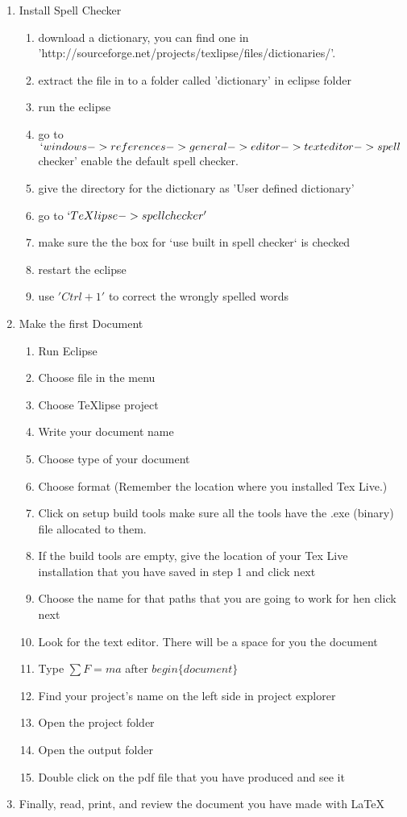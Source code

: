 \documentclass{memoir}
\begin{document}
\begin{enumerate}
  \item Install Spell Checker
  \begin{enumerate}
    \item download a dictionary, you can find one in
    'http://sourceforge.net/projects/texlipse/files/dictionaries/'.
    \item extract the file in to a folder called 'dictionary' in eclipse folder
    \item run the eclipse
    \item go to $`windows-> references ->general->editor->text editor->spell$
    checker' enable the default spell checker.
    \item give the directory for the dictionary as 'User defined dictionary'
    \item go to $`TeXlipse->spellchecker'$
    \item make sure the the box for `use built in spell checker` is checked
    \item restart the eclipse
    \item use $'Ctrl+1'$ to correct the wrongly spelled words
  \end{enumerate}  
  
  \item Make the first Document
  \begin{enumerate}
    \item Run Eclipse
    \item Choose file in the menu 
    \item Choose TeXlipse project  
    \item Write your document name
    \item Choose type of your document
    \item Choose format (Remember the location where you installed Tex Live.) 
    \item Click on setup build tools make sure all the tools have the .exe (binary) file allocated to them.
    \item If the build tools are empty, give the location of your Tex Live installation that you have saved in step 1 and click next
    \item Choose the name for that paths that you are going to work for hen click next
	\item Look for the text editor. There will be a space for you the document
    \item Type $\sum F = ma$ after $begin\{document\}$  
    \item Find your project's name on the left side in project explorer
    \item Open the project folder
    \item Open the output folder
    \item Double click on the pdf file that you have produced and see it    
  \end{enumerate}
  
  \item Finally, read, print, and review the document you have made with \LaTeX
\end{enumerate}
\end{document}

